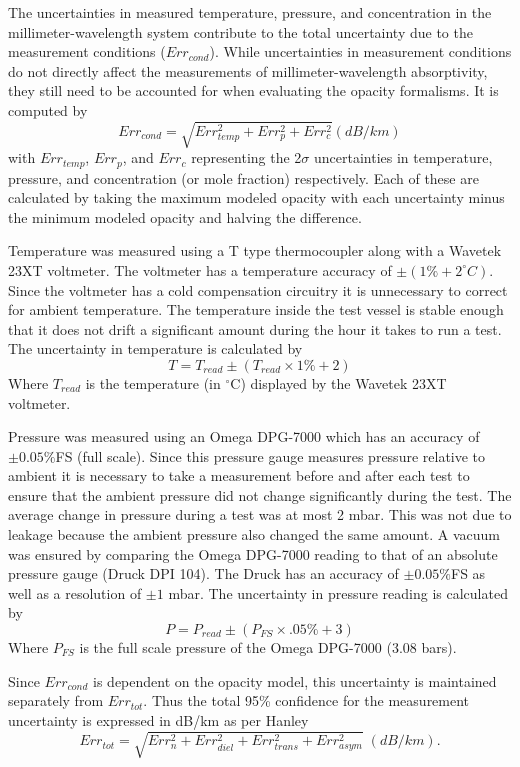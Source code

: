 The uncertainties in measured temperature, pressure, and concentration in the millimeter-wavelength system contribute to the total uncertainty due to the measurement conditions ($Err_{cond}$). While uncertainties in measurement conditions do not directly affect the measurements of millimeter-wavelength absorptivity, they still need to be accounted for when evaluating the opacity formalisms. It is computed by
\begin{equation}
Err_{cond} = \sqrt{Err_{temp}^2 + Err_{p}^2 + Err_{c}^2 } (dB/km)
\end{equation}
with $Err_{temp}$, $Err_{p} $, and $ Err_{c}$ representing the 2$\sigma$ uncertainties  in temperature, pressure, and concentration (or mole fraction) respectively. Each of these are calculated by taking the maximum modeled opacity with each uncertainty minus the minimum modeled opacity and halving the difference. 

Temperature was measured using a T type thermocoupler along with a Wavetek 23XT voltmeter. The voltmeter has a temperature accuracy of $\pm (1\% + 2^\circ C)$. Since the voltmeter has a cold compensation circuitry it is unnecessary to correct for ambient temperature. The temperature inside the test vessel is stable enough that it does not drift a significant amount during the hour it takes to run a test. The uncertainty in temperature is calculated by
\begin{equation}
T = T_{read} \pm ( T_{read} \times 1\% + 2)
\end{equation}
Where $T_{read}$ is the temperature (in $^\circ$C) displayed by the Wavetek 23XT voltmeter.

Pressure was measured using an Omega DPG-7000 which has an accuracy of $\pm 0.05\%$FS (full scale). Since this pressure gauge measures pressure relative to ambient it is necessary to take a measurement before and after each test to ensure that the ambient pressure did not change significantly during the test. The average change in pressure during a test was at most 2 mbar. This was not due to leakage because the ambient pressure also changed the same amount.
A vacuum was ensured by comparing the Omega DPG-7000 reading to that of an absolute pressure gauge (Druck DPI 104). The Druck has an accuracy of $\pm 0.05\%$FS as well as a resolution of $\pm 1$ mbar. The uncertainty in pressure reading is calculated by
\begin{equation}
P = P_{read} \pm ( P_{FS} \times .05\% + 3)
\end{equation}
Where $P_{FS}$ is the full scale pressure of the Omega DPG-7000 (3.08 bars).

Since $Err_{cond}$ is dependent on the opacity model, this uncertainty is maintained separately from $Err_{tot}$. Thus the total 95\% confidence for the measurement uncertainty is expressed in dB/km as per Hanley \cite{Hanley-thesis}
\begin{equation}
Err_{tot} = \sqrt{Err_n^2 + Err_{diel}^2 + Err_{trans}^2 + Err_{asym}^2} \;(dB/km).
\end{equation}

